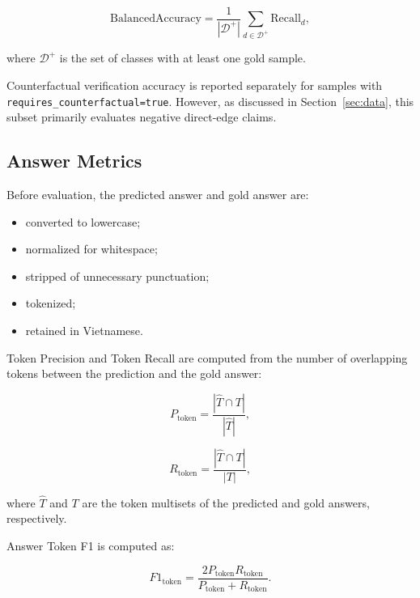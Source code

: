 \begin{equation}
\mathrm{BalancedAccuracy}
=
\frac{1}{|\mathcal{D}^{+}|}
\sum_{d \in \mathcal{D}^{+}}
\mathrm{Recall}_d,
\end{equation}

where \(\mathcal{D}^{+}\) is the set of classes with at least one gold
sample.

Counterfactual verification accuracy is reported separately for samples with
\texttt{requires\_counterfactual=true}. However, as discussed in
Section~\ref{sec:data}, this subset primarily evaluates negative direct-edge
claims.

\subsection{Answer Metrics}

Before evaluation, the predicted answer and gold answer are:

\begin{itemize}
    \item converted to lowercase;
    \item normalized for whitespace;
    \item stripped of unnecessary punctuation;
    \item tokenized;
    \item retained in Vietnamese.
\end{itemize}

Token Precision and Token Recall are computed from the number of overlapping
tokens between the prediction and the gold answer:

\begin{equation}
P_{\mathrm{token}}
=
\frac{
    |\widehat{T} \cap T|
}{
    |\widehat{T}|
},
\end{equation}

\begin{equation}
R_{\mathrm{token}}
=
\frac{
    |\widehat{T} \cap T|
}{
    |T|
},
\end{equation}

where \(\widehat{T}\) and \(T\) are the token multisets of the predicted and
gold answers, respectively.

Answer Token F1 is computed as:

\begin{equation}
F1_{\mathrm{token}}
=
\frac{
    2P_{\mathrm{token}}R_{\mathrm{token}}
}{
    P_{\mathrm{token}}+R_{\mathrm{token}}
}.
\end{equation}

